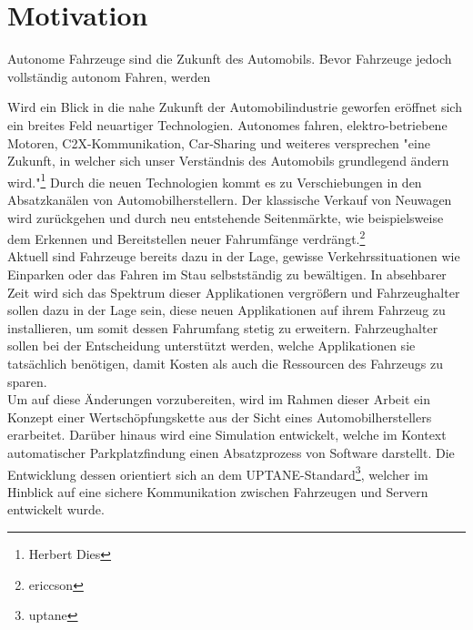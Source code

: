 \setcounter{page}{1}
\section{Motivation}
Autonome Fahrzeuge sind die Zukunft des Automobils. Bevor Fahrzeuge jedoch vollständig autonom Fahren, werden 








Wird ein Blick in die nahe Zukunft der Automobilindustrie geworfen eröffnet sich ein  breites Feld neuartiger Technologien. Autonomes fahren, elektro-betriebene Motoren, C2X-Kommunikation, Car-Sharing und weiteres versprechen "eine Zukunft, in welcher sich unser Verständnis des Automobils grundlegend ändern wird."\footnote{Herbert Dies} Durch die neuen Technologien kommt es zu Verschiebungen in den Absatzkanälen von Automobilherstellern. Der klassische Verkauf von Neuwagen wird zurückgehen und durch neu entstehende Seitenmärkte, wie beispielsweise dem Erkennen und Bereitstellen neuer Fahrumfänge verdrängt.\footnote{ericcson}\\

Aktuell sind Fahrzeuge bereits dazu in der Lage, gewisse Verkehrssituationen wie Einparken oder das Fahren im Stau selbstständig zu bewältigen. In absehbarer Zeit wird sich das Spektrum dieser Applikationen vergrößern und Fahrzeughalter sollen dazu in der Lage sein, diese neuen Applikationen auf ihrem Fahrzeug zu installieren, um somit dessen Fahrumfang stetig zu erweitern. Fahrzeughalter sollen bei der Entscheidung unterstützt werden, welche Applikationen sie tatsächlich benötigen, damit Kosten als auch die Ressourcen des Fahrzeugs zu sparen.\\

Um auf diese Änderungen vorzubereiten, wird im Rahmen dieser Arbeit ein Konzept einer Wertschöpfungskette aus der Sicht eines Automobilherstellers erarbeitet. Darüber hinaus wird eine Simulation entwickelt, welche im Kontext automatischer Parkplatzfindung einen Absatzprozess von Software darstellt. Die Entwicklung dessen orientiert sich an dem UPTANE-Standard\footnote{uptane}, welcher im Hinblick auf eine sichere Kommunikation zwischen Fahrzeugen und Servern entwickelt wurde.\\